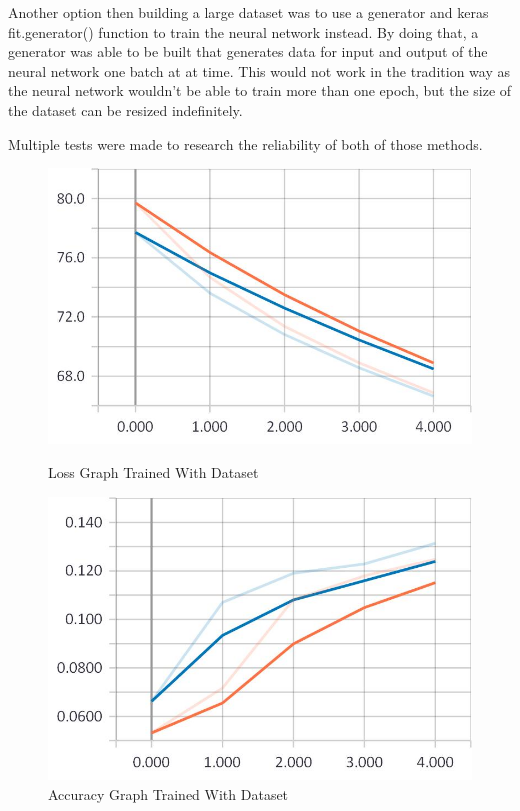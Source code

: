 Another option then building a large dataset was to use a generator and keras fit.generator() function to train the neural network instead. By doing that, a generator was able to be built that generates data for input and output of the neural network one batch at at time. This would not work in the tradition way as the neural network wouldn't be able to train more than one epoch, but the size of the dataset can be resized indefinitely.

Multiple tests were made to research the reliability of both of those methods.

\begin{figure}[htp]
\centering
\begin{minipage}{.5\textwidth}
	\centering
	\includegraphics[width=1\linewidth]{Illustrations/losss1.jpg}
	\caption{Loss Graph Trained With Dataset}
	\label{fig:loss1}
\end{minipage}%
\begin{minipage}{.5\textwidth}
	\centering
	\includegraphics[width=1\linewidth]{Illustrations/accuracy1.jpg}
	\caption{Accuracy Graph Trained With Dataset}
	\label{fig:accuracy1}
\end{minipage}
\end{figure}

